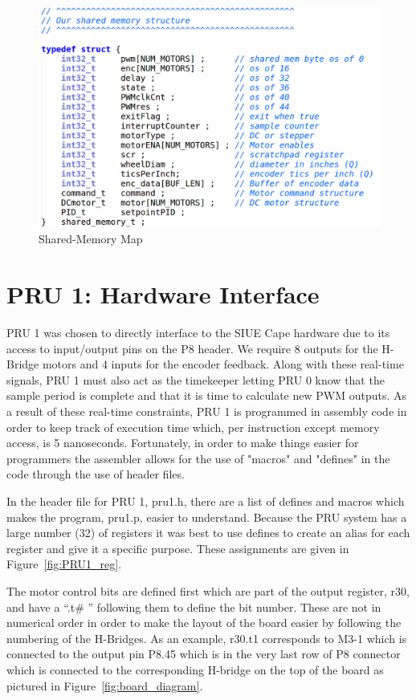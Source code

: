 \documentclass[12pt,oneside,final]{siuethesis}
\theoremstyle{definition}
\begin{document}
\begin{figure}[htbp!]
 \centering
 \includegraphics[scale=.35,keepaspectratio=true]{./images_ch3/sharedmemory-define.png}
 \caption{Shared-Memory Map}
 \label{fig:Shared_Memory}
\end{figure}


\section{PRU 1: Hardware Interface}

PRU 1 was chosen to directly interface to the SIUE Cape hardware due to its access to input/output pins on the P8 header. We require 8 outputs for the H-Bridge motors and 4 inputs for the encoder feedback. Along with these real-time signals, PRU 1 must also act as the timekeeper letting PRU 0 know that the sample period is complete and that it is time to calculate new PWM outputs. As a result of these real-time constraints, PRU 1 is programmed in assembly code in order to keep track of execution time which, per instruction except memory access, is 5 nanoseconds. Fortunately, in order to make things easier for programmers the assembler allows for the use of "macros" and "defines" in the code through the use of header files.

In the header file for PRU 1, pru1.h, there are a list of defines and macros which makes the program, pru1.p, easier to understand. Because the PRU system has a large number (32) of registers it was best to use defines to create an alias for each register and give it a specific purpose. These assignments are given in Figure~\ref{fig:PRU1_reg}. 

The motor control bits are defined first which are part of the output register, r30, and have a “.t\# ” following them to define the bit number. These are not in numerical order in order to make the layout of the board easier by following the numbering of the H-Bridges. As an example, r30.t1 corresponds to M3-1 which is connected to the output pin P8.45 which is in the very last row of P8 connector which is connected to the corresponding H-bridge on the top of the board as pictured in Figure~\ref{fig:board_diagram}. 
\end{document}
